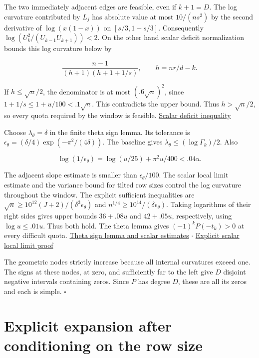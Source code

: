 \documentclass[11pt]{article}
\begin{document}
The two immediately adjacent edges are feasible, even if $k+1=D$. The log curvature contributed by $L_j$ has absolute value at most $10/(n s^2)$ by the second derivative of $\log(x(1-x))$ on $[s/3,1-s/3]$. Consequently $\log(U_k^2/(U_{k-1}U_{k+1}))<2$. On the other hand scalar deficit normalization bounds this log curvature below by

\[
\frac{n-1}{(h+1)(h+1+1/s)},\qquad h=nr/d-k .
\]

If $h\le\sqrt n/2$, the denominator is at most $(.6\sqrt n)^2$, since $1+1/s\le1+u/100<.1\sqrt n$. This contradicts the upper bound. Thus $h>\sqrt n/2$, so every quota required by the window is feasible. \href{https://github.com/ProgramComputer/open-math-research/blob/main/topics/balanced-arrays/adjacent-quotas/README.md}{Scalar deficit inequality}

Choose $\lambda_\theta=\delta$ in the finite theta sign lemma. Its tolerance is $\epsilon_\theta=(\delta/4)\exp(-\pi^2/(4\delta))$. The baseline gives $\lambda_\theta\le(\log\Gamma_k)/2$. Also

\[
\log(1/\epsilon_\theta)=\log(u/25)+\pi^2u/400<.04u .
\]

The adjacent slope estimate is smaller than $\epsilon_\theta/100$. The scalar local limit estimate and the variance bound for tilted row sizes control the log curvature throughout the window. The explicit sufficient inequalities are $\sqrt n\ge 10^{12}(J+2)/(\delta^3\epsilon_\theta)$ and $n^{1/4}\ge10^{14}/(\delta\epsilon_\theta)$. Taking logarithms of their right sides gives upper bounds $36+.08u$ and $42+.05u$, respectively, using $\log u\le .01u$. Thus both hold. The theta lemma gives $(-1)^kP(-t_k)>0$ at every difficult quota. \href{https://github.com/ProgramComputer/open-math-research/blob/main/topics/balanced-arrays/effective-sublinear/theta-window.md}{Theta sign lemma and scalar estimates}  $\cdot$  \href{https://github.com/ProgramComputer/open-math-research/blob/main/topics/balanced-arrays/adjacent-quotas/scalar.md}{Explicit scalar local limit proof}

The geometric nodes strictly increase because all internal curvatures exceed one. The signs at these nodes, at zero, and sufficiently far to the left give $D$ disjoint negative intervals containing zeros. Since $P$ has degree $D$, these are all its zeros and each is simple. $\square$

\section{Explicit expansion after conditioning on the row size}
\end{document}
